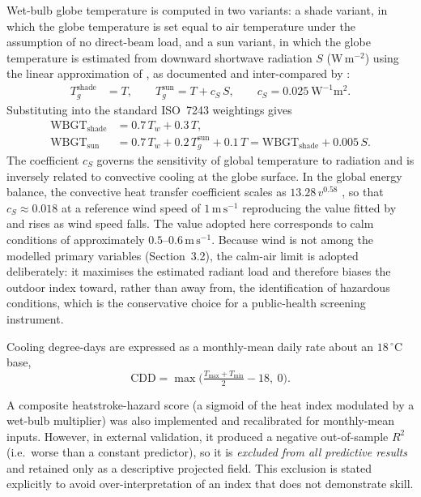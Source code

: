 \documentclass[review,11pt]{elsarticle}
\newcommand{\degC}{\ensuremath{^{\circ}\mathrm{C}}}
\begin{document}
Wet-bulb globe temperature is computed in two variants: a shade variant, in
which the globe temperature is set equal to air temperature under the
assumption of no direct-beam load, and a sun variant, in which the globe
temperature is estimated from downward shortwave radiation $S$
(W\,m$^{-2}$) using the linear approximation of \citet{tonouchi2006}, as
documented and inter-compared by
\citet{lemke2012}:
\begin{align}
T_g^{\text{shade}} &= T, \qquad
T_g^{\text{sun}} = T + c_S\,S, \qquad c_S = 0.025\ \mathrm{W^{-1}m^{2}}.
\end{align}
Substituting into the standard ISO~7243 weightings
\citep{iso7243_2017,yaglou1957} gives
\begin{align}
\mathrm{WBGT_{shade}} &= 0.7\,T_w + 0.3\,T, \\
\mathrm{WBGT_{sun}}   &= 0.7\,T_w + 0.2\,T_g^{\text{sun}} + 0.1\,T
                       = \mathrm{WBGT_{shade}} + 0.005\,S .
\end{align}
The coefficient $c_S$ governs the sensitivity of global temperature to
radiation and is inversely related to convective cooling at the globe
surface. In the global energy balance, the convective heat transfer
coefficient scales as $13.28\,v^{0.58}$ \citep{lemke2012}, so that
$c_S \approx 0.018$ at a reference wind speed of $1\,\mathrm{m\,s^{-1}}$ reproducing the value fitted by \citet{tonouchi2006} and rises as
wind speed falls. The value adopted here corresponds to calm conditions of
approximately $0.5$--$0.6\,\mathrm{m\,s^{-1}}$. Because wind is not among
the modelled primary variables (Section~3.2), the calm-air limit is
adopted deliberately: it maximises the estimated radiant load and
therefore biases the outdoor index toward, rather than away from, the
identification of hazardous conditions, which is the conservative choice
for a public-health screening instrument.

Cooling degree-days are expressed as a monthly-mean daily rate about an
$18\,\degC$ base,
\begin{equation}
\mathrm{CDD}=\max\!\Big(\tfrac{T_{\max}+T_{\min}}{2}-18,\ 0\Big).
\label{eq:cdd}
\end{equation}

A composite heatstroke-hazard score (a sigmoid of the heat index modulated by a
wet-bulb multiplier) was also implemented and recalibrated for monthly-mean
inputs. However, in external validation, it produced a negative out-of-sample
$R^{2}$ (i.e.\ worse than a constant predictor), so it is \emph{excluded from all
predictive results} and retained only as a descriptive projected field. This
exclusion is stated explicitly to avoid over-interpretation of an index that
does not demonstrate skill.
\end{document}
